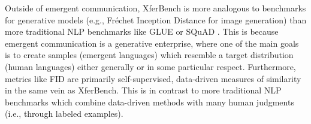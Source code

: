 Outside of emergent communication, XferBench is more analogous to benchmarks for generative models (e.g., Fr\'echet Inception Distance \citep{heusel2017fid} for image generation) than more traditional NLP benchmarks like GLUE \citep{Wang2018GLUEAM} or SQuAD \citep{rajpurkar-etal-2016-squad}.
This is because emergent communication is a generative enterprise, where one of the main goals is to create samples (emergent languages) which resemble a target distribution (human languages) either generally or in some particular respect.
Furthermore, metrics like FID are primarily self-supervised, data-driven measures of similarity in the same vein as XferBench.
This is in contrast to more traditional NLP benchmarks which combine data-driven methods with many human judgments (i.e., through labeled examples).
